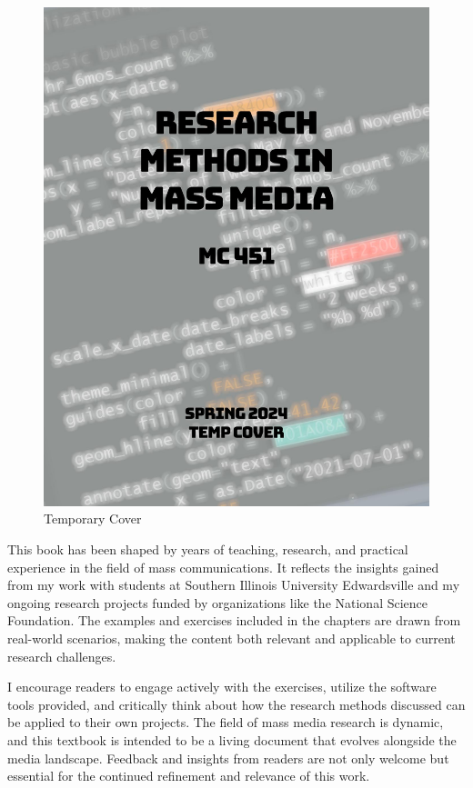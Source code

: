 \documentclass[
]{book}
\begin{document}
\begin{figure}
\centering
\includegraphics[width=1\linewidth,height=\textheight,keepaspectratio]{images/cover.jpg}
\caption{Temporary Cover}
\end{figure}

This book has been shaped by years of teaching, research, and practical experience in the field of mass communications. It reflects the insights gained from my work with students at Southern Illinois University Edwardsville and my ongoing research projects funded by organizations like the National Science Foundation. The examples and exercises included in the chapters are drawn from real-world scenarios, making the content both relevant and applicable to current research challenges.

I encourage readers to engage actively with the exercises, utilize the software tools provided, and critically think about how the research methods discussed can be applied to their own projects. The field of mass media research is dynamic, and this textbook is intended to be a living document that evolves alongside the media landscape. Feedback and insights from readers are not only welcome but essential for the continued refinement and relevance of this work.
\end{document}
